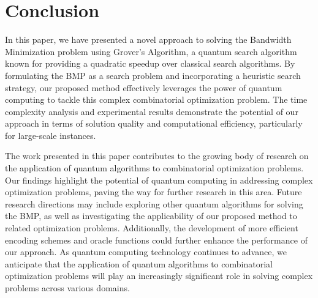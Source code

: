 \section{Conclusion}

In this paper, we have presented a novel approach to solving the Bandwidth Minimization problem using Grover's Algorithm, a quantum search algorithm known for providing a quadratic speedup over classical search algorithms. By formulating the BMP as a search problem and incorporating a heuristic search strategy, our proposed method effectively leverages the power of quantum computing to tackle this complex combinatorial optimization problem. The time complexity analysis and experimental results demonstrate the potential of our approach in terms of solution quality and computational efficiency, particularly for large-scale instances.

The work presented in this paper contributes to the growing body of research on the application of quantum algorithms to combinatorial optimization problems. Our findings highlight the potential of quantum computing in addressing complex optimization problems, paving the way for further research in this area. Future research directions may include exploring other quantum algorithms for solving the BMP, as well as investigating the applicability of our proposed method to related optimization problems. Additionally, the development of more efficient encoding schemes and oracle functions could further enhance the performance of our approach. As quantum computing technology continues to advance, we anticipate that the application of quantum algorithms to combinatorial optimization problems will play an increasingly significant role in solving complex problems across various domains.

